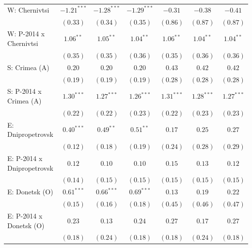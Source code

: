\begin{table}
\begin{center}
\begin{small}
\begin{tabular}{l c c c c c c}
W: Chernivtsi               & $-1.21^{***}$ & $-1.28^{***}$ & $-1.29^{***}$ & $-0.31$      & $-0.38$      & $-0.41$      \\
                            & $(0.33)$      & $(0.34)$      & $(0.35)$      & $(0.86)$     & $(0.87)$     & $(0.87)$     \\
W: P-2014 x Chernivtsi      & $1.06^{**}$   & $1.05^{**}$   & $1.04^{**}$   & $1.06^{**}$  & $1.04^{**}$  & $1.04^{**}$  \\
                            & $(0.35)$      & $(0.35)$      & $(0.36)$      & $(0.35)$     & $(0.36)$     & $(0.36)$     \\
S: Crimea (A)               & $0.20$        & $0.20$        & $0.20$        & $0.43$       & $0.42$       & $0.42$       \\
                            & $(0.19)$      & $(0.19)$      & $(0.19)$      & $(0.28)$     & $(0.28)$     & $(0.28)$     \\
S: P-2014 x Crimea (A)      & $1.30^{***}$  & $1.27^{***}$  & $1.26^{***}$  & $1.31^{***}$ & $1.28^{***}$ & $1.27^{***}$ \\
                            & $(0.22)$      & $(0.22)$      & $(0.23)$      & $(0.22)$     & $(0.23)$     & $(0.23)$     \\
E: Dnipropetrovsk           & $0.40^{***}$  & $0.49^{**}$   & $0.51^{**}$   & $0.17$       & $0.25$       & $0.27$       \\
                            & $(0.12)$      & $(0.18)$      & $(0.19)$      & $(0.24)$     & $(0.28)$     & $(0.29)$     \\
E: P-2014 x Dnipropetrovsk  & $0.12$        & $0.10$        & $0.10$        & $0.15$       & $0.13$       & $0.12$       \\
                            & $(0.14)$      & $(0.15)$      & $(0.15)$      & $(0.15)$     & $(0.15)$     & $(0.15)$     \\
E: Donetsk (O)              & $0.61^{***}$  & $0.66^{***}$  & $0.69^{***}$  & $0.13$       & $0.19$       & $0.22$       \\
                            & $(0.15)$      & $(0.16)$      & $(0.18)$      & $(0.45)$     & $(0.46)$     & $(0.47)$     \\
E: P-2014 x Donetsk (O)     & $0.23$        & $0.13$        & $0.24$        & $0.27$       & $0.17$       & $0.27$       \\
                            & $(0.18)$      & $(0.24)$      & $(0.18)$      & $(0.18)$     & $(0.24)$     & $(0.18)$     \\

\end{tabular}
\end{small}
\end{center}
\end{table}

